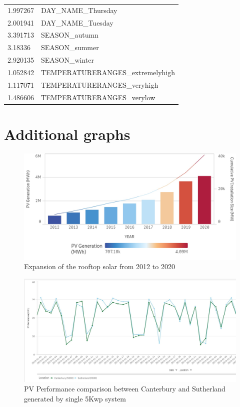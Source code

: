 \documentclass[mstat,12pt]{unswthesis}
\begin{document}
\begin{table}[H]
\begin{tabular}{ll}
1.997267            & DAY\_NAME\_Thursday               \\
2.001941            & DAY\_NAME\_Tuesday                \\
3.391713            & SEASON\_autumn                    \\
3.18336             & SEASON\_summer                    \\
2.920135            & SEASON\_winter                    \\
1.052842            & TEMPERATURERANGES\_extremelyhigh  \\
1.117071            & TEMPERATURERANGES\_veryhigh       \\
1.486606            & TEMPERATURERANGES\_verylow        \\
\hline\hline
\end{tabular}
\label{VIF}
\end{table}

\hypertarget{additional-graphs}{%
\section*{\texorpdfstring{\textbf{Additional
graphs}}{Additional graphs}}\label{additional-graphs}}

\begin{figure}[H]
\includegraphics[width=140mm]{RFSolar.jpeg}
\caption{Expansion of the rooftop solar from 2012 to 2020 }
\label{RFSolar}
\end{figure}

\begin{figure}[H]
\includegraphics[width=140mm]{Cant.jpeg}
\caption{PV Performance comparison between Canterbury and Sutherland generated by single 5Kwp system }
\label{Cant}
\end{figure}
\end{document}
